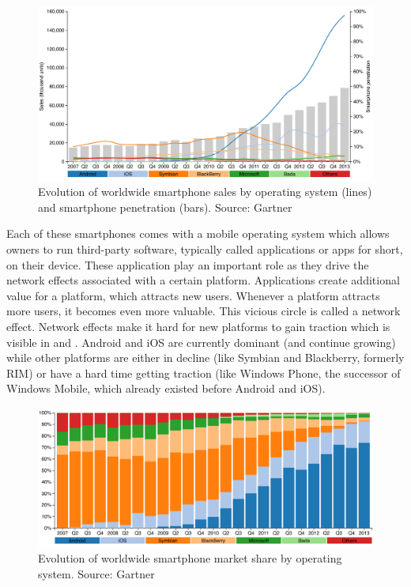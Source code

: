 \begin{figure}[h]
    \begin{center}
        \includegraphics[width=\textwidth]{figs/smartphone_sales.pdf}
        	\caption{
        	    Evolution of worldwide smartphone sales by operating system (lines) and smartphone penetration (bars). Source: Gartner \citeGartner
        	}
        	\label{fig:smartphone-sales}
    \end{center}
\end{figure}

Each of these smartphones comes with a mobile operating system which allows owners to run third-party software, typically called applications or apps for short, on their device. These application play an important role as they drive the network effects associated with a certain platform. Applications create additional value for a platform, which attracts new users. Whenever a platform attracts more users, it becomes even more valuable. This vicious circle is called a network effect. Network effects make it hard for new platforms to gain traction which is visible in  and . Android and iOS are currently dominant (and continue growing) while other platforms are either in decline (like Symbian and Blackberry, formerly RIM) or have a hard time getting traction (like Windows Phone, the successor of Windows Mobile, which already existed before Android and iOS).

\begin{figure}[h]
    \begin{center}
        \includegraphics[width=\textwidth]{figs/smartphone_share.pdf}
        \caption{
            Evolution of worldwide smartphone market share by operating system.\newline 
            Source: Gartner \citeGartner
        	}
        \label{fig:smartphone-share}
    \end{center}
\end{figure}

